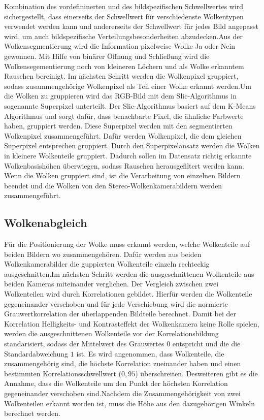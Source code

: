 \documentclass[a4paper,11pt,twoside,german]{article}
\newcommand{\absatz}{\smallbreak}
\begin{document}
Kombination des vordefininerten und des bildspezifischen Schwellwertes wird
sichergestellt, dass einerseits der Schwellwert für verschiedenste Wolkentypen
verwendet werden kann und andererseits der Schwellwert für jedes Bild angepasst
wird, um auch bildspezifische Verteilungsbesonderheiten abzudecken.\absatz Aus
der Wolkensegmentierung wird die Information pixelweise Wolke Ja oder Nein
gewonnen.  Mit Hilfe von binärer Öffnung und Schließung wird die
Wolkensegementierung noch von kleineren Löchern und als Wolke erkanntem Rauschen
bereinigt. Im nächsten Schritt werden die Wolkenpixel gruppiert, sodass
zusammengehörige Wolkenpixel als Teil einer Wolke erkannt werden.\absatz Um die
Wolken zu gruppieren wird das RGB-Bild mit dem Slic-Algorithmus in sogenannte
Superpixel unterteilt. Der Slic-Algorithmus basiert auf dem K-Means Algorithmus
und sorgt dafür, dass benachbarte Pixel, die ähnliche Farbwerte haben, gruppiert
werden. Diese Superpixel werden mit den segmentierten Wolkenpixel
zusammengeführt. Dafür werden Wolkenpixel, die dem gleichen Superpixel
entsprechen gruppiert. Durch den Superpixelansatz werden die Wolken in kleinere
Wolkenteile gruppiert.  Dadurch sollen im Datensatz richtig erkannte
Wolkenbasishöhen überwiegen, sodass Rauschen herausgefiltert werden kann.
\absatz Wenn die Wolken gruppiert sind, ist die Verarbeitung von einzelnen
Bildern beendet und die Wolken von den Stereo-Wolkenkamerabildern werden
zusammengeführt.

\subsection{Wolkenabgleich}
Für die Positionierung der Wolke muss erkannt werden, welche Wolkenteile auf
beiden Bildern wo zusammengehören. Dafür werden aus beiden Wolkenkamerabilder
die guppierten Wolkenteile einzeln rechteckig ausgeschnitten.\absatz Im nächsten
Schritt werden die ausgeschnittenen Wolkenteile aus beiden Kameras miteinander
verglichen. Der Vergleich zwischen zwei Wolkenteilen wird durch Korrelationen
gebildet. Hierfür werden die Wolkenteile gegeneinander verschoben und für jede
Verschiebung wird die normierte Grauwertkorrelation der überlappenden Bildteile
berechnet. Damit bei der Korrelation Helligkeits- und Kontrasteffekt der
Wolkenkamera keine Rolle spielen, werden die ausgeschnittenen Wolkenteile vor
der Korrelationsbildung standarisiert, sodass der Mittelwert des Grauwertes $0$
entspricht und die die Standardabweichung $1$ ist. Es wird angenommen, dass
Wolkenteile, die zusammengehörig sind, die höchste Korrelation zueinander haben
und einen bestimmten Korrelationsschwellwert ($0,95$) überschreiten. Desweiteren
gibt es die Annahme, dass die Wolkenteile um den Punkt der höchsten Korrelation
gegeneinander verschoben sind.\absatz Nachdem die Zusammengehörigkeit von zwei
Wolkenteilen erkannt worden ist, muss die Höhe aus den dazugehörigen Winkeln
berechnet werden.
\end{document}
